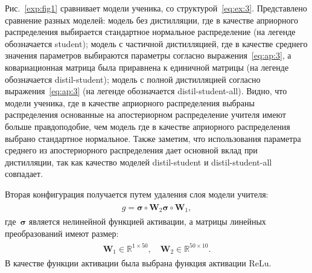 \documentclass[12pt]{a&t}
\begin{document}
Рис.~\ref{exp:fig1} сравнивает модели ученика, со структурой~\eqref{eq:ex:3}. Представлено сравнение разных моделей: модель без дистилляции, где в качестве априорного распределения выбирается стандартное нормальное распределение (на легенде обозначается student); модель с частичной дистилляцией, где в качестве среднего значения параметров выбираются параметры согласно выражения~\eqref{eq:ap:3}, а ковариационная матрица была приравнена к единичной матрицы (на легенде обозначается distil-student); модель с полной дистилляцией согласно выражения~\eqref{eq:ap:3} (на легенде обозначается distil-student-all). Видно, что модели ученика, где в качестве априорного распределения выбраны распределения основанные на апостериорном распределение учителя имеют больше правдоподобие, чем модель где в качестве априорного распределения выбрано стандартное нормальное. Также заметим, что использования параметра среднего из апостериорного распределения дает основной вклад при дистилляции, так как качество моделей distil-student и distil-student-all совпадает.

Вторая конфигурация получается путем удаления слоя модели учителя:
\begin{gather}
\label{eq:ex:5}
\begin{aligned}
g = \bm{\sigma} \circ \mathbf{W}_2\bm{\sigma} \circ \mathbf{W}_1,
\end{aligned}
\end{gather}
где~$\bm{\sigma}$ является нелинейной функцией активации, а матрицы линейных преобразований имеют размер:
\begin{gather}
\label{eq:ex:6}
\begin{aligned}
\mathbf{W}_{1} \in \mathbb{R}^{1 \times 50}, \quad \mathbf{W}_{2} \in \mathbb{R}^{50 \times 10}.
\end{aligned}
\end{gather}
 В качестве функции активации была выбрана функция активации $\text{ReLu}$.
\end{document}
